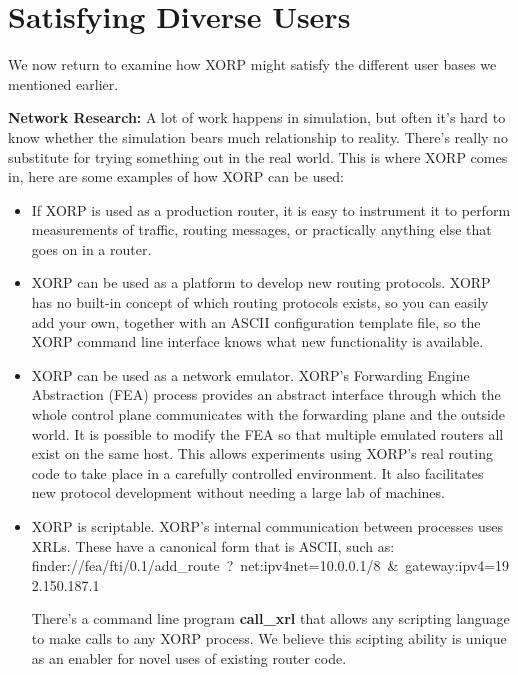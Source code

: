 \section{Satisfying Diverse Users}

\noindent We now return to examine how XORP might satisfy the different user
bases we mentioned earlier.

\vspace{0.1in}\noindent\textbf{Network Research:}
A lot of work happens in simulation,
but often it's hard to know whether the simulation bears much
relationship to reality.  There's really no substitute for trying
something out in the real world.  This is where XORP comes in, here are some examples of how XORP can be used:
\vspace{-0.07in}
\begin{itemize}
\item If XORP is used as a production router, it is easy to instrument
it to perform measurements of traffic, routing messages, or
practically anything else that goes on in a router.  
\vspace{-0.07in}
\item XORP can be used as a platform to develop new routing protocols.
XORP has no built-in concept of which routing protocols exists, so you
can easily add your own, together with an ASCII configuration template
file, so the XORP command line interface knows what new
functionality is available.
\vspace{-0.07in}
\item XORP can be used as a network emulator.
XORP's Forwarding Engine Abstraction (FEA) process provides an
abstract interface through which the whole control plane communicates
with the forwarding plane and the outside world.  It is possible to
modify the FEA so that multiple emulated routers all exist on the same
host.  This allows experiments using XORP's real routing code to take
place in a carefully controlled environment.  It also facilitates new
protocol development without needing a large lab of machines.
\vspace{-0.07in}
\item XORP is scriptable.  XORP's internal communication between
processes uses XRLs.
These have a canonical form that is ASCII, such as:\\
{\sf finder://fea/fti/0.1/add\_route~?~net:ipv4net=10.0.0.1/8~\&~gateway:ipv4=192.150.187.1}

There's a command line program \textbf{call\_xrl} that
allows any scripting language to make calls to any XORP process.  We
believe this scipting ability is unique as an enabler for novel uses of
existing router code.
\end{itemize}

